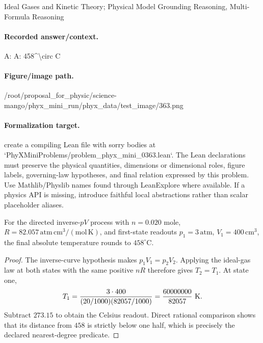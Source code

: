 Ideal Gases and Kinetic Theory; Physical Model Grounding Reasoning, Multi-Formula Reasoning

\paragraph{Recorded answer/context.}
A: A: 458\textasciicircum{}\textbackslash{}circ C

\paragraph{Figure/image path.}
/root/proposal\_for\_physic/science-mango/phyx\_mini\_run/phyx\_data/test\_image/363.png

\paragraph{Formalization target.}
create a compiling Lean file with sorry bodies at `PhyXMiniProblems/problem\_phyx\_mini\_0363.lean`. The Lean declarations must preserve the physical quantities, dimensions or dimensional roles, figure labels, governing-law hypotheses, and final relation expressed by this problem.
Use Mathlib/Physlib names found through LeanExplore where available. If a physics API is missing, introduce faithful local abstractions rather than scalar placeholder aliases.

\begin{theorem}
\label{thm:physics:phyx_mini_0363:target}
For the directed inverse-\(pV\) process with \(n=0.020\) mole,
\(R=82.057\,\mathrm{atm\,cm^3/(mol\,K)}\), and first-state readouts
\(p_1=3\,\mathrm{atm}\), \(V_1=400\,\mathrm{cm^3}\), the final absolute
temperature rounds to \(458^\circ\mathrm C\).
\end{theorem}
\begin{proof}
The inverse-curve hypothesis makes \(p_1V_1=p_2V_2\).  Applying the ideal-gas
law at both states with the same positive \(nR\) therefore gives
\(T_2=T_1\).  At state one,
\[
 T_1=\frac{3\cdot400}{(20/1000)(82057/1000)}
     =\frac{60000000}{82057}\ {\rm K}.
\]
Subtract \(273.15\) to obtain the Celsius readout.  Direct rational
comparison shows that its distance from \(458\) is strictly below one half,
which is precisely the declared nearest-degree predicate.
\end{proof}

